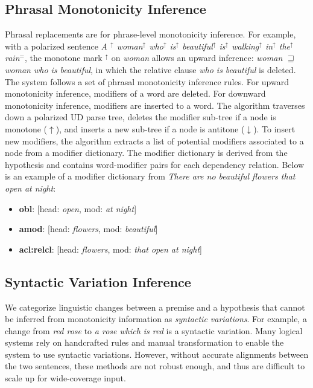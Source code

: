 \documentclass[11pt,a4paper]{article}
\begin{document}
\subsection{Phrasal Monotonicity Inference}
Phrasal replacements are for phrase-level monotonicity inference. For example, with a polarized sentence
\textit{A $^\uparrow$ woman$^\uparrow$ who$^\uparrow$ is$^\uparrow$ beautiful$^\uparrow$ is$^\uparrow$ walking$^\uparrow$ in$^\uparrow$ the$^\uparrow$ rain$^=$}, the monotone mark $^\uparrow$ on \textit{woman} allows an upward inference: \textit{woman} $\sqsupseteq$ \textit{woman who is beautiful}, in which the relative clause \textit{who is beautiful} is deleted.   
The system follows a set of phrasal monotonicity inference rules. For upward monotonicity inference, modifiers of a word are deleted. For downward monotonicity inference, modifiers are inserted to a word. The algorithm traverses down a polarized UD parse tree, deletes the modifier sub-tree if a node is monotone ($\uparrow$), and inserts a new sub-tree if a node is antitone ($\downarrow$). To insert new modifiers, the algorithm extracts a list of potential modifiers associated to a node from a modifier dictionary. The modifier dictionary is derived from the hypothesis and contains word-modifier pairs for each dependency relation. Below is an example of a modifier dictionary from \textit{There are no beautiful flowers that open at night}:
\begin{itemize}
    \small 
    \item \textbf{obl}: [{head: \textit{open}, mod: \textit{at night}}]
    \item \textbf{amod}: [{head: \textit{flowers}, mod: \textit{beautiful}}]
    \item \textbf{acl:relcl}: [{head: \textit{flowers}, mod: \textit{that open at night}}]
\end{itemize}


\subsection{Syntactic Variation Inference}
We categorize linguistic changes between a premise and a hypothesis that cannot be inferred from monotonicity information as \emph{syntactic variations}. For example, a change from \textit{red rose} to \textit{a rose which is red} is a syntactic variation. Many logical systems rely on handcrafted rules and manual transformation to enable the system 
to use syntactic variations. However, without accurate alignments between the two sentences, these methods are not robust enough, and thus are difficult to scale up for wide-coverage input. 
\end{document}
